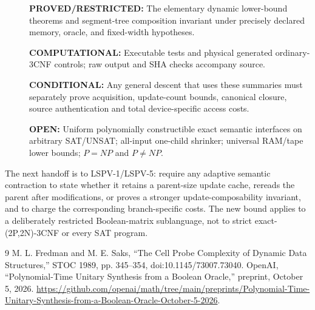 \documentclass[11pt]{article}
\begin{document}
\begin{description}
\item[]\textbf{PROVED/RESTRICTED:} The elementary dynamic lower-bound theorems and segment-tree composition invariant under precisely declared memory, oracle, and fixed-width hypotheses.
\item[]\textbf{COMPUTATIONAL:} Executable tests and physical generated ordinary-3CNF controls; raw output and SHA checks accompany source.
\item[]\textbf{CONDITIONAL:} Any general descent that uses these summaries must separately prove acquisition, update-count bounds, canonical closure, source authentication and total device-specific access costs.
\item[]\textbf{OPEN:} Uniform polynomially constructible exact semantic interfaces on arbitrary SAT/UNSAT; all-input one-child shrinker; universal RAM/tape lower bounds; $P=NP$ and $P\ne NP$.
\end{description}
The next handoff is to LSPV-1/LSPV-5: require any adaptive semantic contraction to state whether it retains a parent-size update cache, rereads the parent after modifications, or proves a stronger update-composability invariant, and to charge the corresponding branch-specific costs. The new bound applies to a deliberately restricted Boolean-matrix sublanguage, not to strict exact-(2P,2N)-3CNF or every SAT program.

\begin{thebibliography}{9}
 M. L. Fredman and M. E. Saks, ``The Cell Probe Complexity of Dynamic Data Structures,'' STOC 1989, pp. 345--354, doi:10.1145/73007.73040.
 OpenAI, ``Polynomial-Time Unitary Synthesis from a Boolean Oracle,'' preprint, October 5, 2026. \url{https://github.com/openai/math/tree/main/preprints/Polynomial-Time-Unitary-Synthesis-from-a-Boolean-Oracle-October-5-2026}.
\end{thebibliography}
\end{document}
